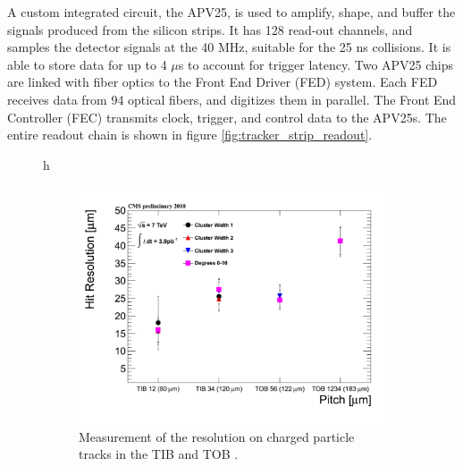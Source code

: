 \par A custom integrated circuit, the APV25, is used to amplify,
shape, and buffer the signals produced from the silicon strips.  It
has 128 read-out channels, and samples the detector signals at the 40
MHz, suitable for the 25 ns collisions.  It is able to store data for
up to 4 $\mu$s to account for trigger latency.  Two APV25 chips are
linked with fiber optics to the Front End Driver (FED) system.  Each
FED receives data from 94 optical fibers, and digitizes them in
parallel.  The Front End Controller (FEC) transmits clock, trigger,
and control data to the APV25s.  The entire readout chain is shown in
figure \ref{fig:tracker_strip_readout}. 

\begin{figure}{h}
    \centering
    \begin{subfigure}[h]{0.450\textwidth}
        \includegraphics[width=\textwidth]{Figures/CMS_Diagrams/Tracker__Strip_HitRes.pdf}
        \caption{Measurement of the resolution on charged particle
          tracks in the TIB and TOB \cite{CMS:tracker_strip_efficiency}.}\label{fig:tracker_strip_hitRes}
      \end{subfigure}
      ~ %
    \begin{subfigure}[h]{0.450\textwidth}

\end{subfigure}
\end{figure}
